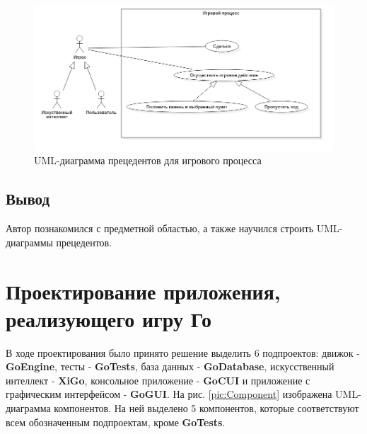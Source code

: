\begin{figure}[H]
	\begin{center}
		\includegraphics[scale=0.545]{../UMLdiagrams/UseCase/GameProcess.png}
		\caption{UML-диаграмма прецедентов для игрового процесса} 
		\label{pic:GameProcess}
	\end{center}
\end{figure}

\subsection*{Вывод}

Автор познакомился с предметной областью, а также научился строить UML-диаграммы прецедентов.

\section*{Проектирование приложения, реализующего игру Го}


В ходе проектирования было принято решение выделить 6 подпроектов: движок - \textbf{GoEngine}, тесты - \textbf{GoTests}, база данных - \textbf{GoDatabase}, 
искусственный интеллект - \textbf{XiGo}, консольное приложение - \textbf{GoCUI} и приложение с графическим интерфейсом - \textbf{GoGUI}. На рис. \ref{pic:Component} изображена UML-диаграмма компонентов. На ней выделено 5 компонентов, которые соответствуют всем обозначенным подпроектам, кроме \textbf{GoTests}.

